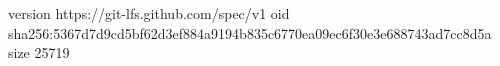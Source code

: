 version https://git-lfs.github.com/spec/v1
oid sha256:5367d7d9cd5bf62d3ef884a9194b835c6770ea09ec6f30e3e688743ad7cc8d5a
size 25719
